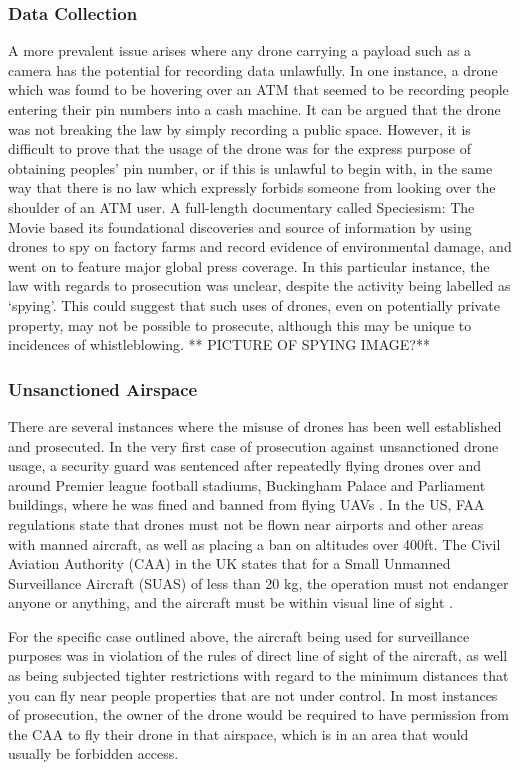 \subsubsection{Data Collection}
A more prevalent issue arises where any drone carrying a payload such as a camera has the potential for recording data unlawfully. In one instance, a drone which was found to be hovering over an ATM that seemed to be recording people entering their pin numbers into a cash machine. It can be argued that the drone was not breaking the law by simply recording a public space\cite{maryannrusson2015}. However, it is difficult to prove that the usage of the drone was for the express purpose of obtaining peoples’ pin number, or if this is unlawful to begin with, in the same way that there is no law which expressly forbids someone from looking over the shoulder of an ATM user.
A full-length documentary called Speciesism: The Movie based its foundational discoveries and source of information by using drones to spy on factory farms and record evidence of environmental damage, and went on to feature major global press coverage. In this particular instance, the law with regards to prosecution was unclear, despite the activity being labelled as ‘spying’. This could suggest that such uses of drones, even on potentially private property, may not be possible to prosecute, although this may be unique to incidences of whistleblowing.
** PICTURE OF SPYING IMAGE?**

\subsubsection{Unsanctioned Airspace}
There are several instances where the misuse of drones has been well established and prosecuted. In the very first case of prosecution against unsanctioned drone usage, a security guard was sentenced after repeatedly flying drones over and around Premier league football stadiums, Buckingham Palace and Parliament buildings, where he was fined and banned from flying UAVs \cite{maryannrusson2015}.  In the US, FAA regulations state that drones must not be flown near airports and other areas with manned aircraft, as well as placing a ban on altitudes over 400ft. The Civil Aviation Authority (CAA) in the UK states that for a Small Unmanned Surveillance Aircraft (SUAS) of less than 20 kg, the operation must not endanger anyone or anything, and the aircraft must be within visual line of sight \cite{civilaviationauthority2015}.

For the specific case outlined above, the aircraft being used for surveillance purposes was in violation of the rules of direct line of sight of the aircraft, as well as being subjected tighter restrictions with regard to the minimum distances that you can fly near people properties that are not under control. In most instances of prosecution, the owner of the drone would be required to have permission from the CAA to fly their drone in that airspace, which is in an area that would usually be forbidden access.

